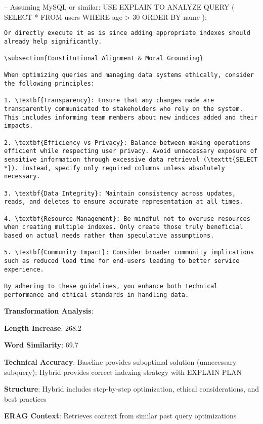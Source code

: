\documentclass[11pt,a4paper]{article}
\begin{document}
-- Assuming MySQL or similar:
USE EXPLAIN TO ANALYZE QUERY (
    SELECT *
    FROM users
    WHERE age > 30
    ORDER BY name
);
\begin{verbatim}
Or directly execute it as is since adding appropriate indexes should already help significantly.

\subsection{Constitutional Alignment & Moral Grounding}

When optimizing queries and managing data systems ethically, consider the following principles:

1. \textbf{Transparency}: Ensure that any changes made are transparently communicated to stakeholders who rely on the system. This includes informing team members about new indices added and their impacts.
  
2. \textbf{Efficiency vs Privacy}: Balance between making operations efficient while respecting user privacy. Avoid unnecessary exposure of sensitive information through excessive data retrieval (\texttt{SELECT *}). Instead, specify only required columns unless absolutely necessary.

3. \textbf{Data Integrity}: Maintain consistency across updates, reads, and deletes to ensure accurate representation at all times.

4. \textbf{Resource Management}: Be mindful not to overuse resources when creating multiple indexes. Only create those truly beneficial based on actual needs rather than speculative assumptions.

5. \textbf{Community Impact}: Consider broader community implications such as reduced load time for end-users leading to better service experience.

By adhering to these guidelines, you enhance both technical performance and ethical standards in handling data.
\end{verbatim}

\textbf{Transformation Analysis}:
\item \textbf{Length Increase}: 268.2%
\item \textbf{Word Similarity}: 69.7%
\item \textbf{Technical Accuracy}: Baseline provides suboptimal solution (unnecessary subquery); Hybrid provides correct indexing strategy with EXPLAIN PLAN
\item \textbf{Structure}: Hybrid includes step-by-step optimization, ethical considerations, and best practices
\item \textbf{ERAG Context}: Retrieves context from similar past query optimizations
\end{document}
